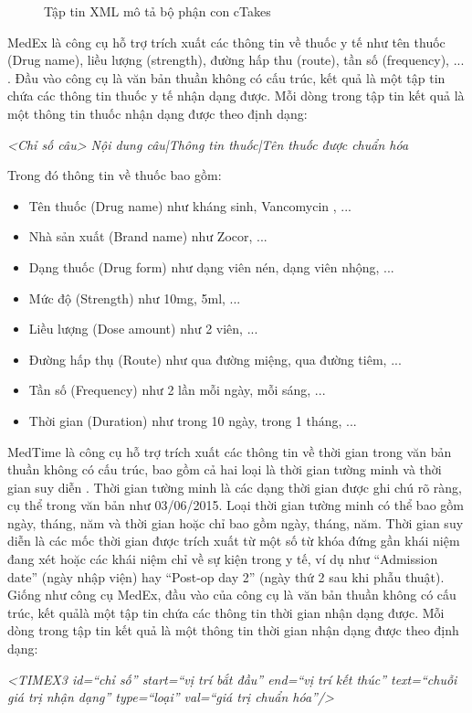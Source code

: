 \begin{figure}[ht]
\centering
{}

\caption{Tập tin XML mô tả bộ phận con cTakes\label{ctakesdesc}}
\end{figure}

MedEx là công cụ hỗ trợ trích xuất các thông tin về thuốc y tế như tên thuốc (Drug name), liều lượng (strength), đường hấp thu (route), tần số (frequency), ... \cite{HuaXu2009}. Đầu vào công cụ là văn bản thuần không có cấu trúc, kết quả là một tập tin chứa các thông tin thuốc y tế nhận dạng được. Mỗi dòng trong tập tin kết quả là một thông tin thuốc nhận dạng được theo định dạng:

\begin{center}
\textit{<Chỉ số câu>	Nội dung câu|Thông tin thuốc|Tên thuốc được chuẩn hóa}
\end{center}

Trong đó thông tin về thuốc bao gồm:

\begin{itemize}[noitemsep]
\item Tên thuốc (Drug name) như kháng sinh, Vancomycin , ...
\item Nhà sản xuất (Brand name) như Zocor, ...
\item Dạng thuốc (Drug form) như dạng viên nén, dạng viên nhộng, ...
\item Mức độ (Strength) như 10mg, 5ml, ...
\item Liều lượng (Dose amount) như 2 viên, ...
\item Đường hấp thụ (Route) như qua đường miệng, qua đường tiêm, ...
\item Tần số (Frequency) như 2 lần mỗi ngày, mỗi sáng, ...
\item Thời gian (Duration) như trong 10 ngày, trong 1 tháng, ...
\end{itemize}

MedTime là công cụ hỗ trợ trích xuất các thông tin về thời gian trong văn bản thuần không có cấu trúc, bao gồm cả hai loại là thời gian tường minh và thời gian suy diễn \cite{Sohn2013}. Thời gian tường minh là các dạng thời gian được ghi chú rõ ràng, cụ thể trong văn bản như 03/06/2015. Loại thời gian tường minh có thể bao gồm ngày, tháng, năm và thời gian hoặc chỉ bao gồm ngày, tháng, năm. Thời gian suy diễn là các mốc thời gian được trích xuất từ một số từ khóa đứng gần khái niệm đang xét hoặc các khái niệm chỉ về sự kiện trong y tế, ví dụ như ``Admission date'' (ngày nhập viện) hay ``Post-op day 2'' (ngày thứ 2 sau khi phẫu thuật). Giống như công cụ MedEx, đầu vào của công cụ là văn bản thuần không có cấu trúc, kết quảlà một tập tin chứa các thông tin thời gian nhận dạng được. Mỗi dòng trong tập tin kết quả là một thông tin thời gian nhận dạng được theo định dạng:

\begin{center}
\textit{<TIMEX3 id=``chỉ số'' start=``vị trí bắt đầu'' end=``vị trí kết thúc'' text=``chuỗi giá trị nhận dạng'' type=``loại'' val=``giá trị chuẩn hóa''/>}\\
\end{center}
